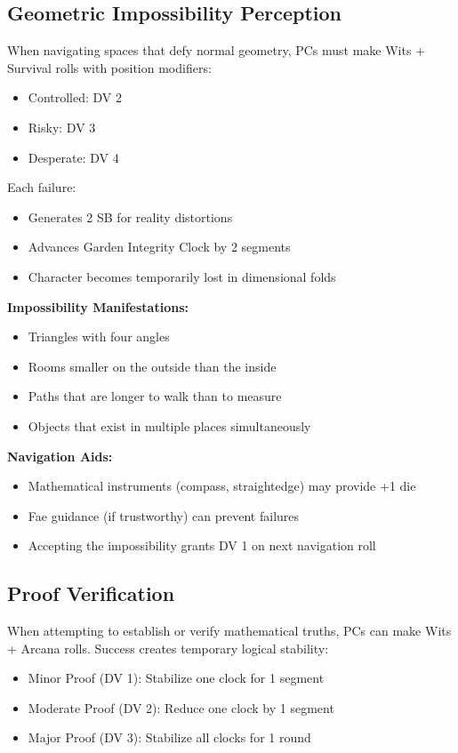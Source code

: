 \documentclass[11pt]{article}
\begin{document}
\subsection{Geometric Impossibility Perception}

When navigating spaces that defy normal geometry, PCs must make Wits + Survival rolls with position modifiers:
\begin{itemize}
\item Controlled: DV 2
\item Risky: DV 3
\item Desperate: DV 4
\end{itemize}

Each failure:
\begin{itemize}
\item Generates 2 SB for reality distortions
\item Advances Garden Integrity Clock by 2 segments
\item Character becomes temporarily lost in dimensional folds
\end{itemize}

\textbf{Impossibility Manifestations:}
\begin{itemize}
\item Triangles with four angles
\item Rooms smaller on the outside than the inside
\item Paths that are longer to walk than to measure
\item Objects that exist in multiple places simultaneously
\end{itemize}

\textbf{Navigation Aids:}
\begin{itemize}
\item Mathematical instruments (compass, straightedge) may provide +1 die
\item Fae guidance (if trustworthy) can prevent failures
\item Accepting the impossibility grants DV 1 on next navigation roll
\end{itemize}

\subsection{Proof Verification}

When attempting to establish or verify mathematical truths, PCs can make Wits + Arcana rolls. Success creates temporary logical stability:
\begin{itemize}
\item Minor Proof (DV 1): Stabilize one clock for 1 segment
\item Moderate Proof (DV 2): Reduce one clock by 1 segment
\item Major Proof (DV 3): Stabilize all clocks for 1 round
\end{itemize}
\end{document}
